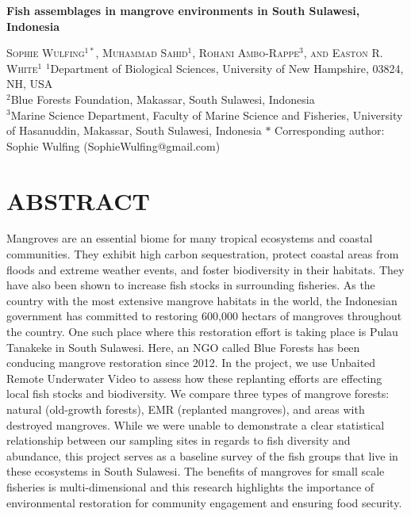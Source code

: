 \documentclass[
]{article}
\author{}
\date{\vspace{-2.5em}}
\begin{document}
\begin{center}
    
\textbf{\Large Fish assemblages in mangrove environments in South Sulawesi, Indonesia}
    
\textsc{Sophie Wulfing$^{1*}$, Muhammad Sahid$^{1}$, Rohani Ambo-Rappe$^{3}$, and Easton R. White$^{1}$}
\vspace{3 mm}
\normalsize{\indent $^1$Department of Biological Sciences, University of New Hampshire, 03824, NH, USA \\ $^2$Blue Forests Foundation, Makassar, South Sulawesi, Indonesia \\ $^3$Marine Science Department, Faculty of Marine Science and Fisheries, University of Hasanuddin, Makassar, South Sulawesi, Indonesia}
$\text{*}$ Corresponding author: Sophie Wulfing (SophieWulfing@gmail.com)
\end{center}

\newpage

\section{ABSTRACT}\label{abstract}

Mangroves are an essential biome for many tropical ecosystems and coastal communities. They exhibit high carbon sequestration, protect coastal areas from floods and extreme weather events, and foster biodiversity in their habitats. They have also been shown to increase fish stocks in surrounding fisheries. As the country with the most extensive mangrove habitats in the world, the Indonesian government has committed to restoring 600,000 hectars of mangroves throughout the country. One such place where this restoration effort is taking place is Pulau Tanakeke in South Sulawesi. Here, an NGO called Blue Forests has been conducing mangrove restoration since 2012. In the project, we use Unbaited Remote Underwater Video to assess how these replanting efforts are effecting local fish stocks and biodiversity. We compare three types of mangrove forests: natural (old-growth forests), EMR (replanted mangroves), and areas with destroyed mangroves. While we were unable to demonstrate a clear statistical relationship between our sampling sites in regards to fish diversity and abundance, this project serves as a baseline survey of the fish groups that live in these ecosystems in South Sulawesi. The benefits of mangroves for small scale fisheries is multi-dimensional and this research highlights the importance of environmental restoration for community engagement and ensuring food security.
\end{document}
